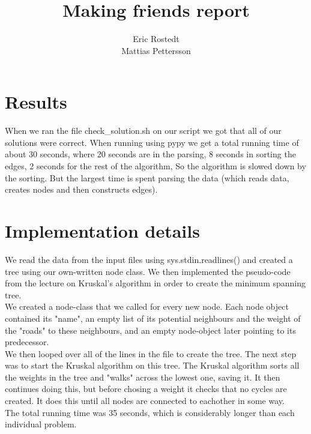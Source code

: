 \documentclass{article}
\title{Making friends report}
\author{Eric Rostedt \\ Mattias Pettersson}
\begin{document}
\maketitle

\section{Results}


When we ran the file check\_solution.sh on our script we got that all of our solutions were correct. When running using pypy we get a total running time of about 30 seconds, where 20 seconds are in the parsing, 8 seconds in sorting the edges, 2 seconds for the rest of the algorithm, So the algorithm is slowed down by the sorting. But the largest time is spent parsing the data (which reads data, creates nodes and then constructs edges).

\section{Implementation details}

We read the data from the input files using sys.stdin.readlines() and created a tree using our own-written node class. We then implemented the pseudo-code from the lecture on Kruskal's algorithm in order to create the minimum spanning tree. \\

We created a node-class that we called for every new node. Each node object contained its "name", an empty list of its potential neighbours and the weight of the "roads" to these neighbours, and an empty node-object later pointing to its predecessor.\\

We then looped over all of the lines in the file to create the tree. The next step was to start the Kruskal algorithm on this tree. The Kruskal algorithm sorts all the weights in the tree and "walks" across the lowest one, saving it. It then continues doing this, but before chosing a weight it checks that no cycles are created. It does this until all nodes are connected to eachother in some way.\\

The total running time was 35 seconds, which is considerably longer than each individual problem.\\
\end{document}
